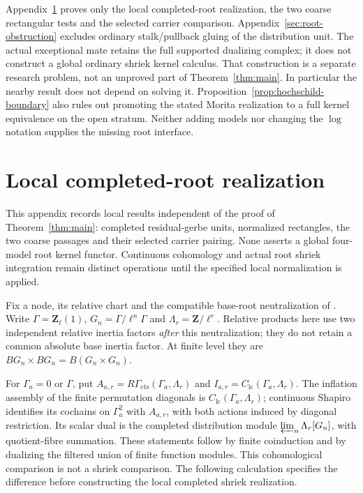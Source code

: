\documentclass[11pt]{article}
\theoremstyle{definition}
\theoremstyle{remark}
\begin{document}
Appendix~\ref{sec:root-interface} proves only the local completed-root
realization, the two coarse rectangular tests and the selected carrier
comparison.  Appendix~\ref{sec:root-obstruction} excludes ordinary
stalk/pullback gluing of the distribution unit.  The actual exceptional
mate retains the full supported dualizing complex; it does not construct
a global ordinary shriek kernel calculus.  That construction is a separate
research problem, not an unproved part of Theorem~\ref{thm:main}.
In particular the nearby result does not depend on solving it.
Proposition~\ref{prop:hochschild-boundary} also rules out promoting the
stated Morita realization to a full kernel equivalence on the open
stratum.  Neither adding models nor changing the $\log$ notation supplies
the missing root interface.

\appendix

\section{Local completed-root realization}
\label{sec:root-interface}
This appendix records local results independent of the proof of
Theorem~\ref{thm:main}: completed residual-gerbe units, normalized
rectangles, the two coarse passages and their selected carrier
pairing.  None asserts a global four-model root kernel functor.
Continuous cohomology and actual root shriek integration remain
distinct operations until the specified local normalization is applied.

Fix a node, its relative chart and the compatible base-root
neutralization of \cite{Local}.  Write
$\Gamma=\mathbf Z_\ell(1)$, $G_n=\Gamma/\ell^n\Gamma$ and
$\Lambda_r=\mathbf Z/\ell^r$.  Relative products here use two
independent relative inertia factors \emph{after} this neutralization;
they do not retain a common absolute base inertia factor.  At finite
level they are $BG_n\times BG_n=B(G_n\times G_n)$.

For $\Gamma_a=0$ or $\Gamma$, put
$A_{a,r}=R\Gamma_{\mathrm{cts}}(\Gamma_a,\Lambda_r)$ and
$I_{a,r}=C_{\mathrm{lc}}(\Gamma_a,\Lambda_r)$.  The inflation assembly of the finite permutation diagonals is
$C_{\mathrm{lc}}(\Gamma_a,\Lambda_r)$; continuous Shapiro identifies
its cochains on $\Gamma_a^2$ with $A_{a,r}$, with both actions
induced by diagonal restriction.  Its scalar dual is the completed
distribution module $\varprojlim_n\Lambda_r[G_n]$, with quotient-fibre
summation.  These statements follow by finite coinduction and
by dualizing the filtered union of finite function modules.
This cohomological comparison is not a shriek comparison.  The
following calculation specifies the difference before constructing
the local completed shriek realization.
\end{document}
